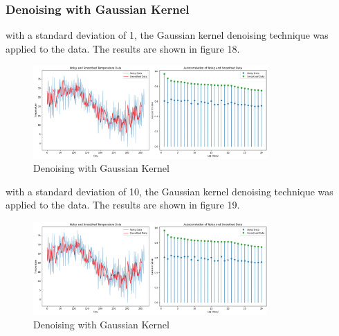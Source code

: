 \documentclass[a4paper,12pt]{article} %
\begin{document}
\subsubsection{ Denoising with Gaussian Kernel}
with a standard deviation of 1, the Gaussian kernel denoising technique was applied to the data. The results are shown in figure 18.
\begin{figure}[h]
\centering
\includegraphics[width=0.8\textwidth]{Q2_GK_1.png}
\caption{Denoising with Gaussian Kernel}
\end{figure}
\clearpage
with a standard deviation of 10, the Gaussian kernel denoising technique was applied to the data. The results are shown in figure 19.
\begin{figure}[h]

\centering
\includegraphics[width=0.8\textwidth]{Q2_GK_10.png}
\caption{Denoising with Gaussian Kernel}
\end{figure}
\clearpage
\end{document}
